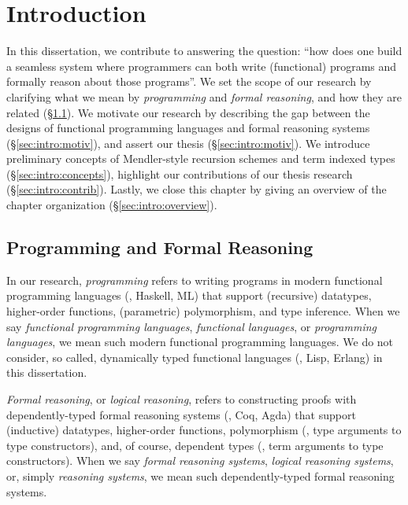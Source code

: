 \chapter{Introduction}\label{ch:intro}

In this dissertation, we contribute to answering the question:
``how does one build a seamless system where programmers can both
write (functional) programs and formally reason about those programs''.
We set the scope of our research by clarifying what we mean by
\emph{programming} and \emph{formal reasoning}, and how they are related
(\S\ref{sec:intro:scope}). We motivate our research by describing the gap
between the designs of functional programming languages and
formal reasoning systems (\S\ref{sec:intro:motiv}), and assert
our thesis (\S\ref{sec:intro:motiv}). We introduce preliminary concepts
of Mendler-style recursion schemes and term indexed types
(\S\ref{sec:intro:concepts}), highlight our contributions of
our thesis research (\S\ref{sec:intro:contrib}). Lastly, we close
this chapter by %
giving an overview of the chapter organization (\S\ref{sec:intro:overview}).

\section{Programming and Formal Reasoning}\label{sec:intro:scope}

In our research, \emph{programming} refers to writing programs in
modern functional programming languages (\eg, Haskell, ML) that support
(recursive) datatypes, higher-order functions, (parametric) polymorphism,
and type inference. When we say \emph{functional programming languages},
\emph{functional languages}, or \emph{programming languages},
we mean such modern functional programming languages. We do not consider,
so called, dynamically typed functional languages (\eg, Lisp, Erlang)
in this dissertation.

\emph{Formal reasoning}, or \emph{logical reasoning},
refers to constructing proofs with dependently-typed formal reasoning systems
(\eg, Coq, Agda) that support (inductive) datatypes, higher-order functions,
polymorphism (\ie, type arguments to type constructors), and, of course,
dependent types (\ie, term arguments to type constructors). When we say
\emph{formal reasoning systems}, \emph{logical reasoning systems},
or, simply \emph{reasoning systems}, we mean such dependently-typed
formal reasoning systems.

